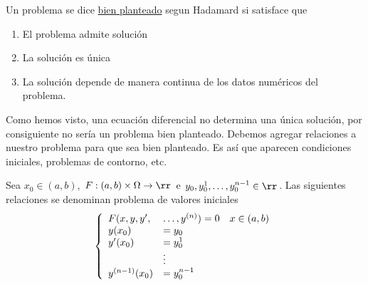  \begin{definicion}\label{defi:had}
 Un problema se dice \link \href{http://es.wikipedia.org/wiki/Problema_bien_definido}{bien planteado} segun Hadamard si satisface que

 \begin{enumerate}
  \item\label{it:had1} El problema admite solución
  \item\label{it:had2} La solución es única
  \item\label{it:had3} La solución depende de manera continua de los datos numéricos del problema.
 \end{enumerate}
\end{definicion}
 Como hemos visto, una ecuación diferencial no determina una única solución, por consiguiente no sería un problema bien planteado. Debemos agregar relaciones
a nuestro problema para que sea bien planteado. Es así que aparecen condiciones iniciales, problemas de contorno, etc.




\begin{definicion} Sea $x_0\in(a,b)$, $F:(a,b)\times \Omega\to\rr$ e $y_0,y_0^1,\ldots,y_0^{n-1}\in\rr$. Las siguientes relaciones  se denominan problema de
valores iniciales
\begin{equation}\label{eq:pvi}
 \left\{\begin{array}{l l l}
         F(x,y,y',&\ldots,y^{(n)})=0& x\in(a,b)\\
         y(x_0)&=y_0&\\
         y'(x_0)&=y_0^1&\\
          & \vdots &\\
          y^{(n-1)}(x_0)&=y_0^{n-1}&\\
        \end{array}
   \right.
\end{equation}

\end{definicion}

